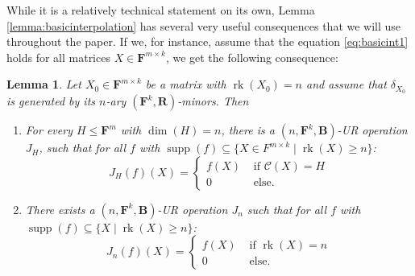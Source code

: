 \documentclass[11pt]{amsart}
\theoremstyle{plain}
\newtheorem{lemma}[thm]{Lemma}
\theoremstyle{definition}
\newcommand{\F}{{\mathbf F}}
\newcommand{\alg}[1]{\mathbf{#1}}
\newcommand{\algB}{\alg{B}}
\newcommand{\algR}{\alg{R}}
\DeclareMathOperator{\rk}{rk}
\DeclareMathOperator{\supp}{supp}
\newcommand{\Col}[1]{\mathcal{C}(#1)}
\begin{document}
While it is a relatively technical statement on its own, Lemma \ref{lemma:basicinterpolation} has several very useful consequences that we will use throughout the paper. If we, for instance, assume that the equation \eqref{eq:basicint1} holds for all matrices $X \in \F^{m \times k}$, we get the following consequence:

\begin{lemma} \label{lemma:thetainterpolation}
Let $X_0 \in \F^{m \times k}$ be a matrix with $\rk(X_0) = n$ and assume that $\delta_{X_0}$ is generated by its $n$-ary $(\F^k,\algR)$-minors. Then 
\begin{enumerate}
\item For every $H \leq \F^{m}$ with $\dim(H) = n$, there is a $(n,\F^k,\algB)$-UR operation $J_H$, such that for all $f$ with $\supp(f) \subseteq \{ X \in F^{m \times k} \mid \rk(X) \geq n \}$:
$$J_H(f)(X) = \begin{cases} f(X) &\text{ if } \Col{X} = H\\ 
0 &\text{ else.} \end{cases}$$
\item There exists a $(n,\F^k,\algB)$-UR operation $J_n$ such that for all $f$ with $\supp(f) \subseteq \{ X \mid \rk(X) \geq n \}$:
$$J_n(f)(X) = \begin{cases} f(X) &\text{ if } \rk(X) = n\\ 
0 &\text{ else.} \end{cases}$$
\end{enumerate}
\end{lemma}
\end{document}
